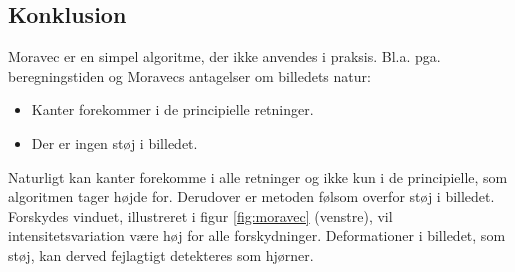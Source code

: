 \subsection*{Konklusion}
Moravec er en simpel algoritme, der ikke anvendes i praksis. Bl.a. pga. beregningstiden og Moravecs antagelser om billedets natur:
\begin{itemize}
\item{Kanter forekommer i de principielle retninger.}
\item{Der er ingen støj i billedet.}
\end{itemize} 
Naturligt kan kanter forekomme i alle retninger og ikke kun i de principielle, som algoritmen tager højde for. Derudover er metoden følsom overfor støj i billedet. Forskydes vinduet, illustreret i figur \ref{fig:moravec} (venstre), vil intensitetsvariation være høj for alle forskydninger. Deformationer i billedet, som støj, kan derved fejlagtigt detekteres som hjørner.